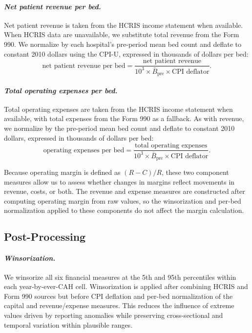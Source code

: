 \documentclass[a4paper, 12pt]{article}
\begin{document}
\paragraph{\textit{Net patient revenue per bed.}} Net patient revenue is taken from the HCRIS income statement when available. When HCRIS data are unavailable, we substitute total revenue from the Form 990. We normalize by each hospital's pre-period mean bed count and deflate to constant 2010 dollars using the CPI-U, expressed in thousands of dollars per bed:
$$
\text{net patient revenue per bed} = \frac{\text{net patient revenue}}{10^3 \times \bar{B}_{\text{pre}} \times \text{CPI deflator}}.
$$

\paragraph{\textit{Total operating expenses per bed.}} Total operating expenses are taken from the HCRIS income statement when available, with total expenses from the Form 990 as a fallback. As with revenue, we normalize by the pre-period mean bed count and deflate to constant 2010 dollars, expressed in thousands of dollars per bed:
$$
\text{operating expenses per bed} = \frac{\text{total operating expenses}}{10^3 \times \bar{B}_{\text{pre}} \times \text{CPI deflator}}.
$$

\noindent Because operating margin is defined as $(R - C)/R$, these two component measures allow us to assess whether changes in margins reflect movements in revenue, costs, or both. The revenue and expense measures are constructed after computing operating margin from raw values, so the winsorization and per-bed normalization applied to these components do not affect the margin calculation.

\subsection{Post-Processing}

\paragraph{\textit{Winsorization.}} We winsorize all six financial measures at the 5th and 95th percentiles within each year-by-ever-CAH cell. Winsorization is applied after combining HCRIS and Form 990 sources but before CPI deflation and per-bed normalization of the capital and revenue/expense measures. This reduces the influence of extreme values driven by reporting anomalies while preserving cross-sectional and temporal variation within plausible ranges.
\end{document}
